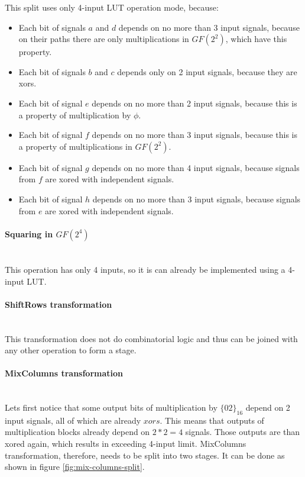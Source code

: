 This split uses only 4-input LUT operation mode, because:
\begin{itemize}[nolistsep]
\item Each bit of signals $a$ and $d$ depends on no more than 3 input signals, because on their paths there are only multiplications in $GF(2^2)$, which have this property. 
\item Each bit of signals $b$ and $c$ depends only on 2 input signals, because they are xors.
\item Each bit of signal $e$ depends on no more than 2 input signals, because this is a property of multiplication by $\phi$.
\item Each bit of signal $f$ depends on no more than 3 input signals, because this is a property of multiplications in $GF(2^2)$.
\item Each bit of signal $g$ depends on no more than 4 input signals, because signals from $f$ are xored with independent signals.
\item Each bit of signal $h$ depends on no more than 3 input signals, because signals from $e$ are xored with independent signals.
\end{itemize}


\paragraph{Squaring in $GF(2^4)$}\mbox{}\\
This operation has only 4 inputs, so it is can already be implemented using a 4-input LUT.


\paragraph{ShiftRows transformation}\mbox{}\\
This transformation does not do combinatorial logic and thus can be joined with any other operation to form a stage.


\paragraph{MixColumns transformation}\mbox{}\\
Lets first notice that some output bits of multiplication by $\{02\}_{16}$ depend on 2 input signals, all of which are already $xors$. This means that outputs of multiplication blocks already depend on $2 * 2 = 4$ signals. Those outputs are than xored again, which results in exceeding 4-input limit. MixColumns transformation, therefore, needs to be split into two stages. It can be done as shown in figure \ref{fig:mix-columns-split}.


